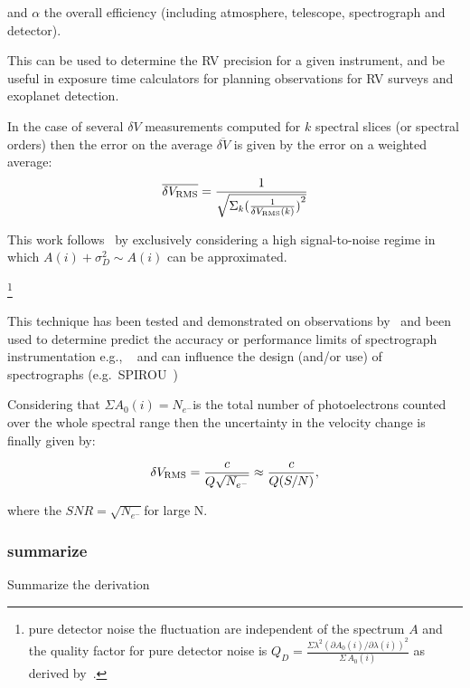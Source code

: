 and \(\alpha\) the overall efficiency (including atmosphere, telescope, spectrograph and detector).

This can be used to determine the {RV} precision for a given instrument, and be useful in exposure time calculators for planning observations for RV surveys and exoplanet detection.

In the case of several \(\delta V\) measurements computed for \(k\) spectral slices (or spectral orders) then the error on the average \(\overline{\delta V}\) is given by the error on a weighted average:
\begin{equation}
\overline{\delta {V}_{\textrm{RMS}}} = \frac{1}{\sqrt{\Sigma_k{{(\frac{1}{\delta V_{\textrm{RMS}}(k)})}^{2}}}}
\end{equation}


This work follows~\cite{figueira_radial_2016} by exclusively considering a high signal-to-noise regime in which \(A(i) + \sigma_{D}^{2} \sim A(i)\) can be approximated.


\footnote{pure detector noise the fluctuation are independent of the spectrum \(A\) and the quality factor for pure detector noise is \(Q_D = \frac{\Sigma{\lambda^{2} {(\partial A_0(i)/\partial \lambda(i))}^{2}}}{\Sigma{\, A_0(i)}}\) as derived by~\cite{connes_absolute_1985}. }


This technique has been tested and demonstrated on observations by~\citet{connes_demonstration_1996} and been used to determine predict the accuracy or performance limits of spectrograph instrumentation e.g., ~\citet{connes_absolute_1985,bouchy_fundamental_2001} and can influence the design (and/or use) of spectrographs
 (e.g.\ SPIROU~\citep{artigau_spirou_2014,figueira_radial_2016})


Considering that \(\Sigma{A_0(i)} = N_{e^-}\)is the total number of photoelectrons counted over the whole spectral range then the uncertainty in the velocity change is finally given by:

\begin{equation}
\delta V_{\textrm{RMS}} = \frac{c}{Q \sqrt{N_{e^-}}} \approx \frac{c}{Q (S/N)}, \label{eq:rv_SNR}
\end{equation}

where the \({SNR}=\sqrt{N_{e^-}}\)for large N. 



\subsubsection{summarize}
Summarize the derivation

